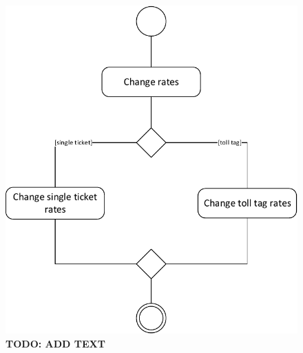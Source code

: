 \begin{figure}
\centerline{\includegraphics[width=\textwidth]{img/activity_diagrams/Change_rates}}
\caption{\textbf{TODO: ADD TEXT}}
\label{fig:activity_cr}
\end{figure}

